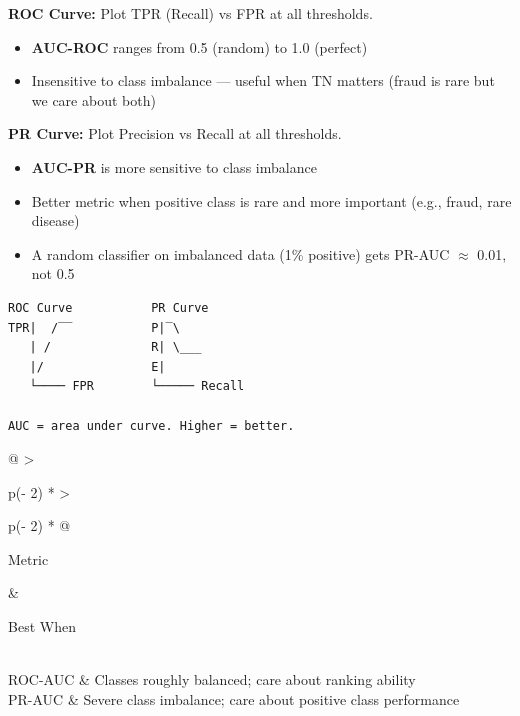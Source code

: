 \documentclass[11pt]{article}
\providecommand{\tightlist}{\setlength{\itemsep}{1pt}\setlength{\parskip}{0pt}}
\begin{document}

\textbf{ROC Curve:} Plot TPR (Recall) vs FPR at all thresholds.

\begin{itemize}
\tightlist
\item
  \textbf{AUC-ROC} ranges from 0.5 (random) to 1.0 (perfect)
\item
  Insensitive to class imbalance --- useful when TN matters (fraud is rare but we care about both)
\end{itemize}

\textbf{PR Curve:} Plot Precision vs Recall at all thresholds.

\begin{itemize}
\tightlist
\item
  \textbf{AUC-PR} is more sensitive to class imbalance
\item
  Better metric when positive class is rare and more important (e.g., fraud, rare disease)
\item
  A random classifier on imbalanced data (1\% positive) gets PR-AUC \(\approx\) 0.01, not 0.5
\end{itemize}

\setcodelang{}

\begin{verbatim}
ROC Curve           PR Curve
TPR|  /‾‾           P|‾\
   | /              R| \___
   |/               E|
   └──── FPR        └───── Recall

AUC = area under curve. Higher = better.
\end{verbatim}

\begin{longtable}[]{@{}
  >{\raggedright\arraybackslash}p{(\columnwidth - 2\tabcolsep) * }
  >{\raggedright\arraybackslash}p{(\columnwidth - 2\tabcolsep) * \real{0.8760}}@{}}
\toprule\noalign{}
\begin{minipage}[b]{\linewidth}\raggedright
Metric
\end{minipage} & \begin{minipage}[b]{\linewidth}\raggedright
Best When
\end{minipage} \\
\midrule\noalign{}
\endhead
\bottomrule\noalign{}
\endlastfoot
ROC-AUC & Classes roughly balanced; care about ranking ability \\
\rowcolor{zebra}
PR-AUC & Severe class imbalance; care about positive class performance \\
\end{longtable}
\end{document}
